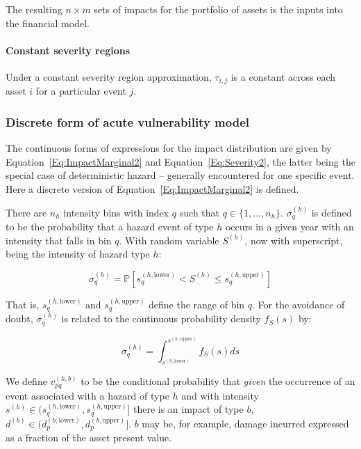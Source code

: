 \documentclass[a4paper,11pt]{extarticle} %
\begin{document}
The resulting $n \times m$ sets of impacts for the portfolio of assets is the inputs into the financial model.

\paragraph{Constant severity regions}
Under a constant severity region approximation, $\tau_{i, j}$ is a constant across each asset $i$ for a particular event $j$.
 

\subsubsection{Discrete form of acute vulnerability model}
\label{Sec:MathematicalDescriptionOfAssetImpactModel}

The continuous forms of expressions for the impact distribution are given by Equation~\ref{Eq:ImpactMarginal2} and Equation~\ref{Eq:Severity2}, the latter being the special case of deterministic hazard -- generally encountered for one specific event. Here a discrete version of Equation~\ref{Eq:ImpactMarginal2} is defined.

There are $n_h$ intensity bins with index $q$ such that $q \in \{1, \dots, n_h \}$.  $\sigma^{(h)}_q$ is defined to be the probability that a hazard event of type $h$ occurs in a given year with an intensity that falls in bin $q$. With random variable $S^{(h)}$, now with superscript, being the intensity of hazard type $h$:

\begin{equation}
    \label{Eq:Discrete1}
    \sigma^{(h)}_q = \mathbb{P} \left[ s^{(h, \text{lower})}_q < S^{(h)} \le s^{(h, \text{upper})}_q \right]
\end{equation}

That is, $s^{(h, \text{lower})}_q$ and $s^{(h, \text{upper})}_q$ define the range of bin $q$. For the avoidance of doubt, $\sigma^{(h)}_q$ is related to the continuous probability density $f_S(s)$ by:

\begin{equation}
	\label{Eq:Discrete2}
	\sigma^{(h)}_q = \int_ {s^{(h, \text{lower})}}^{s^{(h, \text{upper})}} f_S(s) ds 
\end{equation}

We define $v^{(h, b)}_{pq}$ to be the conditional probability that \emph{given} the occurrence of an event associated with a hazard of type $h$ and with intensity $s^{(h)} \in (s^{(h, \text{lower})}_q, s^{(h, \text{upper})}_q]$ there is an impact of type $b$, $d^{(b)} \in (d^{(b,\text{lower})}_p, d^{(b,\text{upper})}_p]$. $b$ may be, for example, damage incurred expressed as a fraction of the asset present value. 
\end{document}

